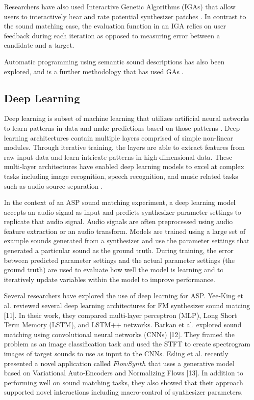 Researchers have also used Interactive Genetic Algorithms (IGAs) that allow users to interactively hear and rate potential synthesizer patches \cite{johnson1999exploring, dahlstedt2001creating, yee2016use}. In contrast to the sound matching case, the evaluation function in an IGA relies on user feedback during each iteration as opposed to measuring error between a candidate and a target. 

Automatic programming using semantic sound descriptions has also been explored, and is a further methodology that has used GAs \cite{krekovic2016algorithm}.

\subsection{Deep Learning}
Deep learning is subset of machine learning that utilizes artificial neural networks to learn patterns in data and make predictions based on those patterns \cite{lecun2015deep}. Deep learning architectures contain multiple layers comprised of simple non-linear modules. Through iterative training, the layers are able to extract features from raw input data and learn intricate patterns in high-dimensional data. These multi-layer architectures have enabled deep learning models to excel at complex tasks including image recognition, speech recognition, and music related tasks such as audio source separation \cite{spleeter2019}.

In the context of an ASP sound matching experiment, a deep learning model accepts an audio signal as input and predicts synthesizer parameter settings to replicate that audio signal. Audio signals are often preprocessed using audio feature extraction or an audio transform. Models are trained using a large set of example sounds generated from a synthesizer and use the parameter settings that generated a particular sound as the ground truth. During training, the error between predicted parameter settings and the actual parameter settings (the ground truth) are used to evaluate how well the model is learning and to iteratively update variables within the model to improve performance. 

Several researchers have explored the use of deep learning for ASP. Yee-King et al. reviewed several deep learning architectures for FM synthesizer sound matcing [11]. In their work, they compared multi-layer perceptron (MLP), Long Short Term Memory (LSTM), and LSTM++ networks. Barkan et al. explored sound matching using convolutional neural networks (CNNs) [12]. They framed the problem as an image classification task and used the STFT to create spectrogram images of target sounds to use as input to the CNNs. Esling et al. recently presented a novel application called $FlowSynth$ that uses a generative model based on Variational Auto-Encoders and Normalizing Flows [13]. In addition to performing well on sound matching tasks, they also showed that their approach supported novel interactions including macro-control of synthesizer parameters.

